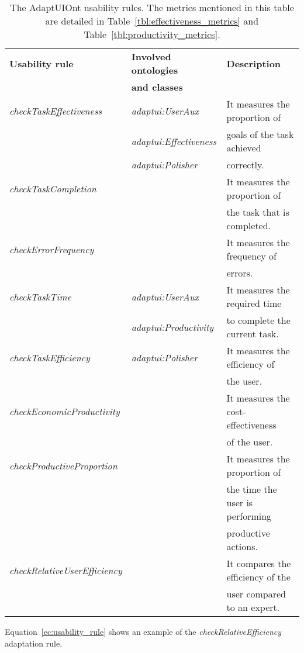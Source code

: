 \begin{table}
  \caption{The AdaptUIOnt usability rules. The metrics mentioned in this table
  are detailed in Table~\ref{tbl:effectiveness_metrics} and Table~\ref{tbl:productivity_metrics}.}
 \label{tbl:usability_rules}
\footnotesize
\centering
 \begin{tabular}{l l l}
  \hline 
  \textbf{Usability rule} 	& \textbf{Involved ontologies} 	& \textbf{Description} 		\\
				& \textbf{and classes} 		& 				\\
  \hline
  \textit{checkTaskEffectiveness}&\textit{adaptui:UserAux}	& It measures the proportion of \\
				& \textit{adaptui:Effectiveness}& goals of the task achieved	\\
				& \textit{adaptui:Polisher}	& correctly. 			\\
  \textit{checkTaskCompletion}	& 				& It measures the proportion of	\\
				& 				& the task that is completed.	\\
  \textit{checkErrorFrequency}	& 				& It measures the frequency of 	\\
				& 				& errors.			\\
  \hline
  \textit{checkTaskTime}	& \textit{adaptui:UserAux}	& It measures the required time	\\
				& \textit{adaptui:Productivity}	& to complete the current task.	\\
  \textit{checkTaskEfficiency}	& \textit{adaptui:Polisher}	& It measures the efficiency of	\\
				& 				& the user.			\\
  \textit{checkEconomicProductivity} &				& It measures the cost-effectiveness\\
				&				& of the user.			\\
  \textit{checkProductiveProportion} & 				& It measures the proportion of \\
				& 				& the time the user is performing\\
				&				& productive actions.		\\
  \textit{checkRelativeUserEfficiency}& 			& It compares the efficiency of the\\
				&				& user compared to an expert.	\\
  \hline
\end{tabular}
\end{table}

Equation~\ref{ec:usability_rule} shows an example of the \textit{checkRelativeEfficiency} 
adaptation rule.

